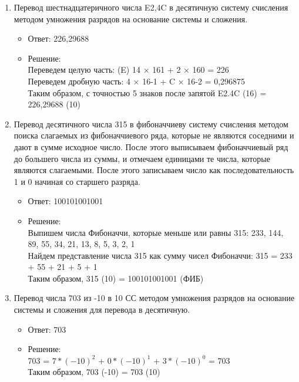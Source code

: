 \documentclass[14pt,final,oneside]{extreport}%
\begin{document}
\begin{enumerate}
        \item Перевод шестнадцатеричного числа E2,4C в десятичную систему счисления методом умножения разрядов на основание системы и сложения.
        \begin{itemize}
            \item Ответ: 226,29688
            \item Решение: \\
                Переведем целую часть: (E) 14 × 161 + 2 × 160 = 226 \\
                Переведем дробную часть: 4 × 16-1 + C × 16-2 = 0,296875 \\ 
                Таким образом, с точностью 5 знаков после запятой E2.4C (16) = 226,29688 (10)
        \end{itemize}

        \item Перевод десятичного числа 315 в фибоначчиеву систему счисления методом поиска слагаемых из фибоначчиевого ряда, которые не являются соседними и дают в сумме исходное число. После этого выписываем фибоначчиевый ряд до большего числа из суммы, и отмечаем единицами те числа, которые являются слагаемыми. После этого записываем число как последовательность 1 и 0 начиная со старшего разряда.
        \begin{itemize}
            \item Ответ: 100101001001
            \item Решение: \\
                Выпишем числа Фибоначчи, которые меньше или равны 315: 233, 144, 89, 55, 34, 21, 13, 8, 5, 3, 2, 1 \\
                Найдем представление числа 315 как сумму чисел Фибоначчи: 315 = 233 + 55 + 21 + 5 + 1 \\
                Таким образом, 315 (10) = 100101001001 (ФИБ)
        \end{itemize}

        \item Перевод числа 703 из -10 в 10 СС методом умножения разрядов на основание системы и сложения для перевода в десятичную.
        \begin{itemize}
            \item Ответ: 703
            \item Решение: \\
                703 = ${7*(-10)^2}$ + ${0*(-10)^1}$ + ${3*(-10)^0}$ = 703 \\
                Таким образом, 703 (-10) = 703 (10)
        \end{itemize}


\end{enumerate}
\end{document}
